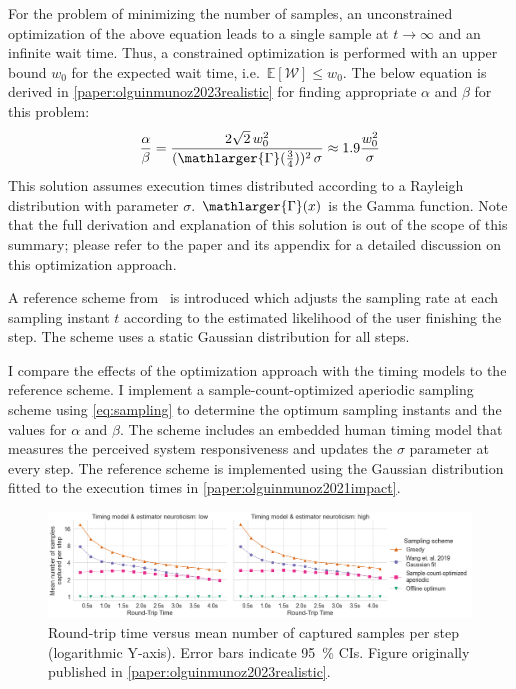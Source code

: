 \medskip
For the problem of minimizing the number of samples, an unconstrained optimization of the above equation leads to a single sample at \ensuremath{t \rightarrow \infty} and an infinite wait time.
Thus, a constrained optimization is performed with an upper bound \ensuremath{w_0} for the expected wait time, i.e.\ \ensuremath{\mathbb{E}[\mathcal{W}] \leq w_0}.
The below equation is derived in \cref{paper:olguinmunoz2023realistic} for finding appropriate \ensuremath{\alpha} and \ensuremath{\beta} for this problem:
\begin{alignat}{1}\label{eq:sampling}
\frac{\alpha}{\beta}=\frac{2\sqrt{2}\,w_0^2}{(\mathlarger{\Gamma}(\tfrac{3}{4}))^2\,\sigma}\approx1.9\frac{w_0^2}{\sigma}
\end{alignat}
This solution assumes execution times distributed according to a Rayleigh distribution with parameter \ensuremath{\sigma}.
\ensuremath{\mathlarger{\Gamma}(x)} is the Gamma function.
Note that the full derivation and explanation of this solution is out of the scope of this summary;
please refer to the paper and its appendix for a detailed discussion on this optimization approach.

A reference scheme from~\cite{wang2019towards} is introduced which adjusts the sampling rate at each sampling instant \ensuremath{t} according to the estimated likelihood of the user finishing the step.
The scheme uses a static Gaussian distribution for all steps.

I compare the effects of the optimization approach with the timing models to the reference scheme.
I implement a sample-count-optimized aperiodic sampling scheme using \cref{eq:sampling} to determine the optimum sampling instants and the values for \ensuremath{\alpha} and \ensuremath{\beta}.
The scheme includes an embedded human timing model that measures the perceived system responsiveness and updates the \ensuremath{\sigma} parameter at every step.
The reference scheme is implemented using the Gaussian distribution fitted to the execution times in \cref{paper:olguinmunoz2021impact}.

\begin{figure}
    \centering
    \includegraphics[width=\textwidth]{publications/2023EdgeDroid2/figs/new_model/sampling_optimization}
    \caption{%
        Round-trip time versus mean number of captured samples per step (logarithmic Y-axis).
        Error bars indicate \SI{95}{\percent} \glspl{CI}.
        Figure originally published in \cref{paper:olguinmunoz2023realistic}.
    }\label{fig:samplingresults}
\end{figure}

